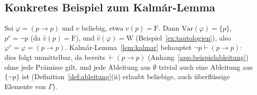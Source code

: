 \documentclass[12pt, a4paper]{article}
\theoremstyle{definition}
\theoremstyle{remark}
\newcommand{\W}{\mathrm{W}}
\newcommand{\F}{\mathrm{F}}
\newcommand{\Var}{\mathrm{Var}}
\begin{document}
\subsection{Konkretes Beispiel zum Kalmár-Lemma}
\label{app:kalmar_beispiel}

Sei $\varphi = (p\to p)$ und $v$ beliebig, etwa $v(p)=\F$. Dann $\Var(\varphi)=\{p\}$, $p^v=\neg p$ (da $\hat v(p)=\F$), und $\hat v(\varphi)=\W$ (Beispiel~\ref{ex:tautologien}), also $\varphi^v=\varphi=(p\to p)$. Kalmár-Lemma~\ref{lem:kalmar} behauptet $\neg p \vdash (p\to p)$: dies folgt unmittelbar, da bereits $\vdash (p\to p)$ (Anhang~\ref{app:beispielableitung}) ohne jede Prämisse gilt, und jede Ableitung aus $\emptyset$ trivial auch eine Ableitung aus $\{\neg p\}$ ist (Definition~\ref{def:ableitung}(ii) erlaubt beliebige, auch überflüssige Elemente von $\Gamma$).
\end{document}
